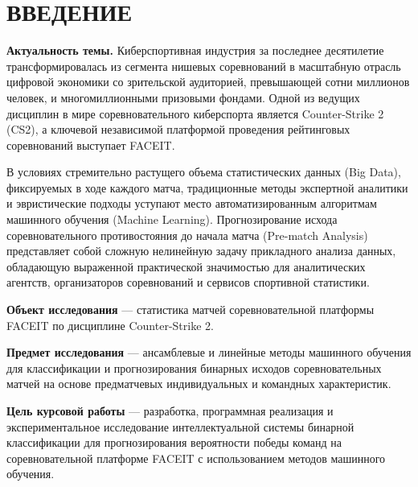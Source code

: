 \documentclass[14pt, a4paper]{extarticle}
\begin{document}
\newpage
\tableofcontents
\newpage

\section*{ВВЕДЕНИЕ}

\textbf{Актуальность темы.} Киберспортивная индустрия за последнее десятилетие трансформировалась из сегмента нишевых соревнований в масштабную отрасль цифровой экономики со зрительской аудиторией, превышающей сотни миллионов человек, и многомиллионными призовыми фондами. Одной из ведущих дисциплин в мире соревновательного киберспорта является Counter-Strike 2 (CS2), а ключевой независимой платформой проведения рейтинговых соревнований выступает FACEIT. 

В условиях стремительно растущего объема статистических данных (Big Data), фиксируемых в ходе каждого матча, традиционные методы экспертной аналитики и эвристические подходы уступают место автоматизированным алгоритмам машинного обучения (Machine Learning). Прогнозирование исхода соревновательного противостояния до начала матча (Pre-match Analysis) представляет собой сложную нелинейную задачу прикладного анализа данных, обладающую выраженной практической значимостью для аналитических агентств, организаторов соревнований и сервисов спортивной статистики.

\textbf{Объект исследования} --- статистика матчей соревновательной платформы FACEIT по дисциплине Counter-Strike 2.

\textbf{Предмет исследования} --- ансамблевые и линейные методы машинного обучения для классификации и прогнозирования бинарных исходов соревновательных матчей на основе предматчевых индивидуальных и командных характеристик.

\textbf{Цель курсовой работы} --- разработка, программная реализация и экспериментальное исследование интеллектуальной системы бинарной классификации для прогнозирования вероятности победы команд на соревновательной платформе FACEIT с использованием методов машинного обучения.
\end{document}
